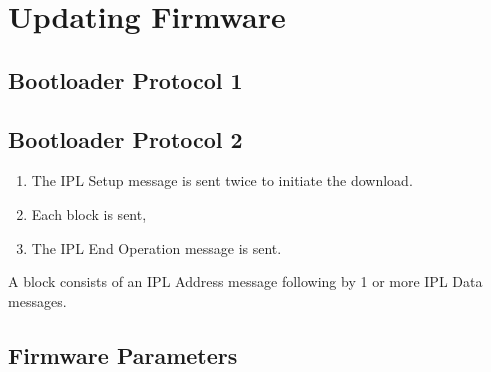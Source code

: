  

\chapter[Updating Firmware]{Updating Firmware}

\section{Bootloader Protocol 1}


\section{Bootloader Protocol 2}

\begin{enumerate}
\item The IPL Setup message is sent twice to initiate the download.
\item Each block is sent,
\item The IPL End Operation message is sent.
\end{enumerate}

A block consists of an IPL Address message following by 1 or more IPL Data messages.



\section{Firmware Parameters}

